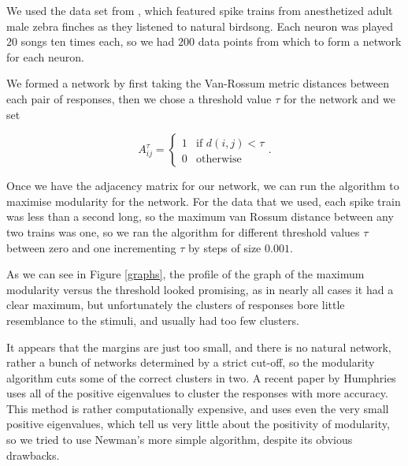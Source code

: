 We used the data set from \cite{NarayanEtAl2006b}, which featured spike trains 
from anesthetized adult male zebra finches as they listened to natural 
birdsong.  Each neuron was played $20$ songs ten times each, so we had $200$ 
data points from which to form a network for each neuron.

We formed a network by first taking the Van-Rossum metric distances between 
each pair of responses, then we chose a threshold value $\tau$ for the network 
and we set

\begin{equation}
A^{\tau}_{ij} = \left\{ \begin{array}{ll} 1 & \mbox{if }d(i,j)<\tau \\
0 & \mbox{otherwise}
\end{array}\right. .
\end{equation}

Once we have the adjacency matrix for our network, we can run the algorithm to 
maximise modularity for the network.  For the data that we used, 
each spike train was less than a second long, so the maximum van Rossum 
distance between any two trains was one, so we ran the algorithm for different 
threshold values $\tau$ between zero and one incrementing $\tau$ by steps of 
size $0.001$.

As we can see in Figure \ref{graphs}, the profile of the graph of the maximum 
modularity versus the threshold looked promising, as in nearly all cases it had 
a clear maximum, but unfortunately the clusters of responses bore little 
resemblance to the stimuli, and usually had too few clusters.


It appears that the margins are just too small, and there is no natural 
network, rather a bunch of networks determined by a strict cut-off, so the 
modularity algorithm cuts some of the correct clusters in two.  A recent paper 
by Humphries \cite{Humphries2011a} uses all of the positive eigenvalues to 
cluster the responses with more accuracy. This method is 
rather computationally expensive, and uses even the very small positive 
eigenvalues, which tell us very little about the positivity of modularity, so 
we tried to use Newman's more simple algorithm, despite its obvious drawbacks.

